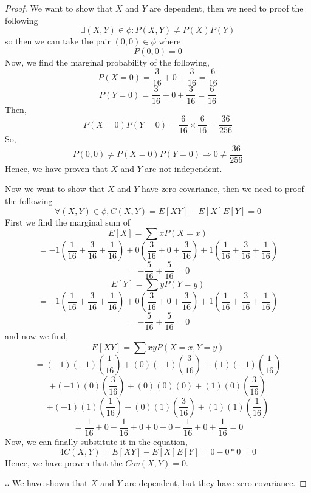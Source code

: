 \documentclass[12pt]{article}
\begin{document}
\begin{enumerate}
\begin{proof}
			We want to show that $X$ and $Y$ are dependent, then we need to proof the following
			$$\exists(X,Y)\in\phi: P(X,Y) \neq P(X)P(Y)$$
			so then we can take the pair $(0,0)\in\phi$ where
			$$P(0,0) = 0$$
			Now, we find the marginal probability of the following,
			$$P(X = 0) = \frac{3}{16} + 0 + \frac{3}{16} = \frac{6}{16}$$
			$$P(Y = 0) = \frac{3}{16} + 0 + \frac{3}{16} = \frac{6}{16}$$
			Then, 
			$$P(X = 0)P(Y = 0) = \frac{6}{16} \times \frac{6}{16} = \frac{36}{256}$$
			So,
			$$P(0,0) \neq P(X = 0)P(Y = 0) \Rightarrow 0 \neq \frac{36}{256}$$
			Hence, we have proven that $X$ and $Y$ are not independent.
			
			Now we want to show that $X$ and $Y$ have zero covariance, then we need to proof the following
			$$\forall(X,Y)\in\phi, C(X,Y) = E[XY] - E[X]E[Y] = 0$$
			First we find the marginal sum of
			$$E[X] = \sum xP(X = x)$$
			$$= -1(\frac{1}{16} + \frac{3}{16} + \frac{1}{16}) + 0(\frac{3}{16} + 0 + \frac{3}{16}) + 1(\frac{1}{16}+ \frac{3}{16} + \frac{1}{16})$$
			$$= -\frac{5}{16} + \frac{5}{16} = 0$$
			$$E[Y] = \sum yP(Y = y)$$
			$$= -1(\frac{1}{16} + \frac{3}{16} + \frac{1}{16}) + 0(\frac{3}{16} + 0 + \frac{3}{16}) + 1(\frac{1}{16}+ \frac{3}{16} + \frac{1}{16})$$
			$$= -\frac{5}{16} + \frac{5}{16} = 0$$
			and now we find,
			$$E[XY] = \sum xyP(X = x, Y = y)$$
			$$= (-1)(-1)(\frac{1}{16}) + (0)(-1)(\frac{3}{16}) + (1)(-1)(\frac{1}{16})$$
			$$ + (-1)(0)(\frac{3}{16}) + (0)(0)(0) + (1)(0)(\frac{3}{16})$$
			$$ + (-1)(1)(\frac{1}{16}) + (0)(1)(\frac{3}{16}) + (1)(1)(\frac{1}{16})$$
			$$= \frac{1}{16} + 0 - \frac{1}{16} + 0 + 0 + 0 - \frac{1}{16} + 0 + \frac{1}{16} = 0$$
			Now, we can finally substitute it in the equation,
			$$4C(X,Y) = E[XY] - E[X]E[Y] = 0 - 0*0 = 0$$
			Hence, we have proven that the $Cov(X, Y) = 0$.
			
			$\therefore$ We have shown that $X$ and $Y$ are dependent, but they have zero covariance.
		\end{proof}

		
\end{enumerate}
\end{document}
